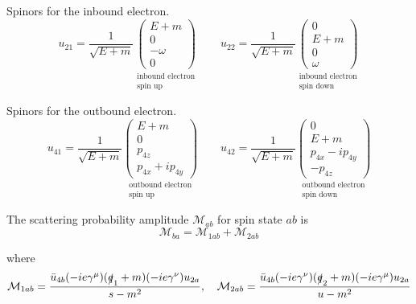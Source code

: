 Spinors for the inbound electron.
\begin{equation*}
u_{21}=\frac{1}{\sqrt{E+m}}
\underset{\substack{\text{inbound electron}\\ \text{spin up}}}
{\begin{pmatrix}
E+m\\
0\\
-\omega\\
0
\end{pmatrix}}
\qquad
u_{22}=\frac{1}{\sqrt{E+m}}
\underset{\substack{\text{inbound electron}\\ \text{spin down}}}
{\begin{pmatrix}
0\\
E+m\\
0\\
\omega
\end{pmatrix}}
\end{equation*}

Spinors for the outbound electron.
\begin{equation*}
u_{41}=\frac{1}{\sqrt{E+m}}
\underset{\substack{\text{outbound electron}\\ \text{spin up}}}
{\begin{pmatrix}
E+m\\
0\\
p_{4z}\\
p_{4x}+ip_{4y}
\end{pmatrix}}
\qquad
u_{42}=\frac{1}{\sqrt{E+m}}
\underset{\substack{\text{outbound electron}\\ \text{spin down}}}
{\begin{pmatrix}
0\\
E+m\\
p_{4x}-ip_{4y}\\
-p_{4z}
\end{pmatrix}}
\end{equation*}

The scattering probability amplitude $\mathcal M_{ab}$ for spin state $ab$ is
\begin{equation*}
\mathcal M_{ba}=\mathcal M_{1ab}+\mathcal M_{2ab}
\end{equation*}

where
\begin{equation*}
\mathcal M_{1ab}=
\frac{\bar{u}_{4b}(-ie\gamma^\mu)(\slashed{q}_1+m)(-ie\gamma^\nu)u_{2a}}{s-m^2},
\quad
\mathcal M_{2ab}=
\frac{\bar{u}_{4b}(-ie\gamma^\nu)(\slashed{q}_2+m)(-ie\gamma^\mu)u_{2a}}{u-m^2}
\end{equation*}

